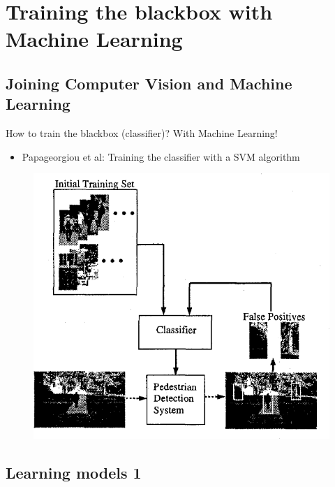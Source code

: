\documentclass{beamer}[10pt, usepdftitle=false, handout]
\begin{document}
		
	\section{Training the blackbox with Machine Learning}    
    
	\subsection{Joining Computer Vision and Machine Learning}    
    
    \begin{frame}
	

	How to train the blackbox (classifier)? With Machine Learning!		
	\vspace*{0.5em}
	
	\begin{itemize}	
	\item{Papageorgiou et al: Training the classifier with a SVM algorithm}
	\end{itemize}

	\begin{figure}
		\includegraphics[scale=0.5]{27.png} 
	\end{figure}
	
    \end{frame}    
    
    \subsection{Learning models 1}    
    
\end{document}
